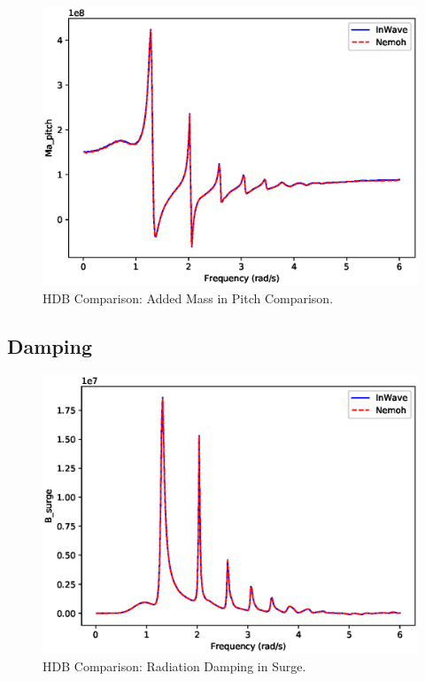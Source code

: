 \documentclass[11pt]{article}
\begin{document}
\begin{figure}[htbp]
\centering
\includegraphics[width=.9\linewidth]{images/hdb/Ma_pitch.eps}
\caption{HDB Comparison: Added Mass in Pitch Comparison.}
\end{figure}

\clearpage
\subsection{Damping}
\label{sec:org89ffc0f}

\begin{figure}[htbp]
\centering
\includegraphics[width=.9\linewidth]{images/hdb/B_surge.eps}
\caption{HDB Comparison: Radiation Damping in Surge.}
\end{figure}
\end{document}
